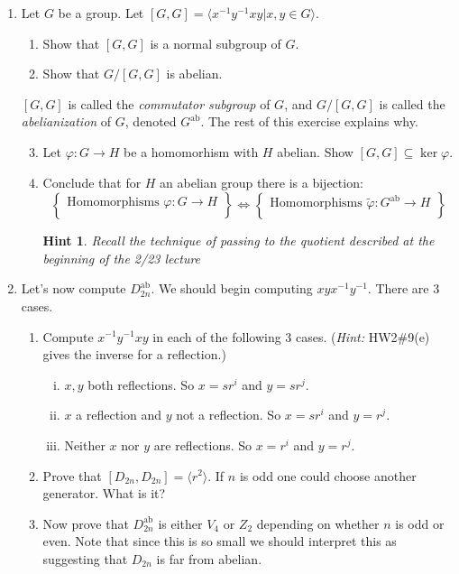 \documentclass[11pt]{article}
\newtheorem*{hint}{Hint}
\newcommand{\la}{\langle}
\newcommand{\ra}{\rangle}
\newcommand{\ab}{\mathrm{ab}}
\begin{document}
\begin{enumerate}
\begin{enumerate}
  \end{enumerate}
  \item Let $G$ be a group.  Let $[G,G] = \la x^{-1}y^{-1}xy | x,y\in G\ra$.
  \begin{enumerate}
    \item Show that $[G,G]$ is a normal subgroup of $G$.
    \item Show that $G/[G,G]$ is abelian.
  \end{enumerate}
  $[G,G]$ is called the \textit{commutator subgroup} of $G$, and $G/[G,G]$ is called the \textit{abelianization} of $G$, denoted $G^\ab$.  The rest of this exercise explains why.
  \begin{enumerate}
    \setcounter{enumii}{2}
    \item Let $\varphi:G\to H$ be a homomorhism with $H$ abelian.  Show $[G,G]\subseteq\ker\varphi$.
    \item Conclude that for $H$ an abelian group there is a bijection:
    \[\left\{
    \begin{array}{c}
      \text{Homomorphisms }\varphi:G\to H\\
    \end{array}\right\}
    \Longleftrightarrow
    \left\{
    \begin{array}{c}
      \text{Homomorphisms }\tilde\varphi:G^\ab\to H\\
    \end{array}
    \right\}
    \]
    \begin{hint}
      Recall the technique of passing to the quotient described at the beginning of the 2/23 lecture
    \end{hint}
  \end{enumerate}
  \item Let's now compute $D_{2n}^\ab$.  We should begin computing $xyx^{-1}y^{-1}$.  There are 3 cases.
  \begin{enumerate}
    \item Compute $x^{-1}y^{-1}xy$ in each of the following 3 cases. (\textit{Hint:} HW2\#9(e) gives the inverse for a reflection.)
    \begin{enumerate}[(i)]
      \item $x,y$ both reflections.  So $x=sr^i$ and $y=sr^j$.
      \item $x$ a reflection and $y$ not a reflection.  So $x=sr^i$ and $y=r^j$.
      \item Neither $x$ nor $y$ are reflections.  So $x=r^i$ and $y=r^j$.
    \end{enumerate}
    \item Prove that $[D_{2n},D_{2n}] = \la r^2\ra$.  If $n$ is odd one could choose another generator.  What is it?
    \item Now prove that $D_{2n}^\ab$ is either $V_4$ or $Z_2$ depending on whether $n$ is odd or even.  Note that since this is so small we should interpret this as suggesting that $D_{2n}$ is far from abelian.
  \end{enumerate}
\end{enumerate}
\end{document}
